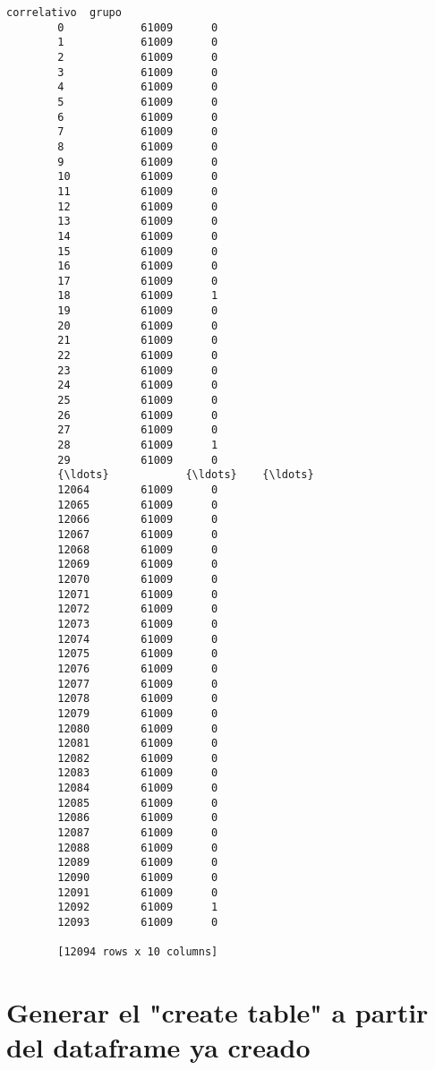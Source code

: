 \documentclass[11pt]{article}
\begin{document}
\begin{Verbatim}[commandchars=\\\{\}]
               correlativo  grupo  
        0            61009      0  
        1            61009      0  
        2            61009      0  
        3            61009      0  
        4            61009      0  
        5            61009      0  
        6            61009      0  
        7            61009      0  
        8            61009      0  
        9            61009      0  
        10           61009      0  
        11           61009      0  
        12           61009      0  
        13           61009      0  
        14           61009      0  
        15           61009      0  
        16           61009      0  
        17           61009      0  
        18           61009      1  
        19           61009      0  
        20           61009      0  
        21           61009      0  
        22           61009      0  
        23           61009      0  
        24           61009      0  
        25           61009      0  
        26           61009      0  
        27           61009      0  
        28           61009      1  
        29           61009      0  
        {\ldots}            {\ldots}    {\ldots}  
        12064        61009      0  
        12065        61009      0  
        12066        61009      0  
        12067        61009      0  
        12068        61009      0  
        12069        61009      0  
        12070        61009      0  
        12071        61009      0  
        12072        61009      0  
        12073        61009      0  
        12074        61009      0  
        12075        61009      0  
        12076        61009      0  
        12077        61009      0  
        12078        61009      0  
        12079        61009      0  
        12080        61009      0  
        12081        61009      0  
        12082        61009      0  
        12083        61009      0  
        12084        61009      0  
        12085        61009      0  
        12086        61009      0  
        12087        61009      0  
        12088        61009      0  
        12089        61009      0  
        12090        61009      0  
        12091        61009      0  
        12092        61009      1  
        12093        61009      0  
        
        [12094 rows x 10 columns]
\end{Verbatim}
            
    \section{Generar el "create table" a partir del dataframe ya
creado}\label{generar-el-create-table-a-partir-del-dataframe-ya-creado}
\end{document}
